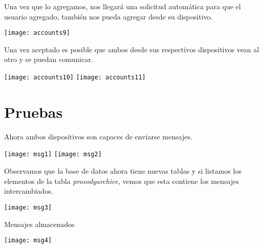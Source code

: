 \documentclass[10pt,letterpaper]{article}
\begin{document}
Una vez que lo agregamos, nos llegará una solicitud automática para que el usuario agregado, también nos pueda agregar desde su dispositivo.

\begin{center}
\texttt{[image: accounts9]}
\end{center}

Una vez aceptado es posible que ambos desde sus respectivos dispositivos vean al otro y se puedan comunicar.

\begin{center}
\texttt{[image: accounts10]}
\texttt{[image: accounts11]}
\end{center}

\section{Pruebas}

Ahora ambos dispositivos son capaces de enviarse mensajes.

\begin{center}
\texttt{[image: msg1]}
\texttt{[image: msg2]}
\end{center}

Observamos que la base de datos ahora tiene nuevas tablas y si listamos los elementos de la tabla \textit{prosodyarchive}, vemos que esta contiene los mensajes intercambiados.

\begin{center}
\texttt{[image: msg3]}
\end{center}

\clearpage
Mensajes almacenados

\begin{center}
\texttt{[image: msg4]}
\end{center}
\end{document}
